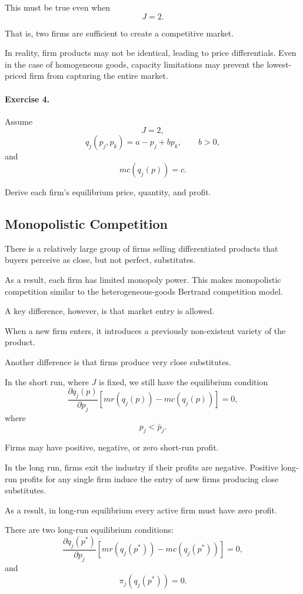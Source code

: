 This must be true even when
\[
J=2.
\]

That is, two firms are sufficient to create a competitive market.

In reality, firm products may not be identical, leading to price differentials. Even in the case of homogeneous goods, capacity limitations may prevent the lowest-priced firm from capturing the entire market.

\paragraph{Exercise 4.}
Assume
\[
J=2,
\]
\[
q_j(p_j,p_k)=a-p_j+bp_k,
\qquad
b>0,
\]
and
\[
mc(q_j(p))=c.
\]

Derive each firm's equilibrium price, quantity, and profit.



\subsection{Monopolistic Competition}

There is a relatively large group of firms selling differentiated products that buyers perceive as close, but not perfect, substitutes.

As a result, each firm has limited monopoly power. This makes monopolistic competition similar to the heterogeneous-goods Bertrand competition model.

A key difference, however, is that market entry is allowed.

When a new firm enters, it introduces a previously non-existent variety of the product.

Another difference is that firms produce very close substitutes.

In the short run, where \(J\) is fixed, we still have the equilibrium condition
\[
\frac{\partial q_j(p)}{\partial p_j}
\left[
mr(q_j(p))-mc(q_j(p))
\right]
=
0,
\]
where
\[
p_j<\bar p_j.
\]

Firms may have positive, negative, or zero short-run profit.

In the long run, firms exit the industry if their profits are negative. Positive long-run profits for any single firm induce the entry of new firms producing close substitutes.

As a result, in long-run equilibrium every active firm must have zero profit.

There are two long-run equilibrium conditions:
\[
\frac{\partial q_j(p^*)}{\partial p_j}
\left[
mr(q_j(p^*))-mc(q_j(p^*))
\right]
=
0,
\]
and
\[
\pi_j(q_j(p^*))=0.
\]

